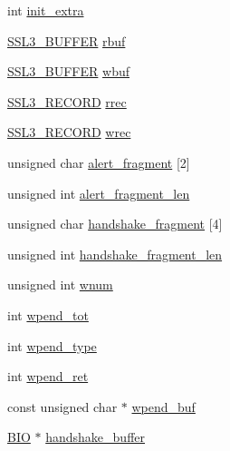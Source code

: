 \begin{DoxyCompactItemize}
\item 
int \hyperlink{structssl3__state__st_a903ef4b0ee733b2cbcbd71680ad12aaa}{init\+\_\+extra}
\item 
\hyperlink{include_2openssl_2ssl3_8h_a83f21b8b26819013daff26a110d590a8}{S\+S\+L3\+\_\+\+B\+U\+F\+F\+ER} \hyperlink{structssl3__state__st_a9a1d2af51256a2a27b1b5b12d3b8e6ee}{rbuf}
\item 
\hyperlink{include_2openssl_2ssl3_8h_a83f21b8b26819013daff26a110d590a8}{S\+S\+L3\+\_\+\+B\+U\+F\+F\+ER} \hyperlink{structssl3__state__st_a4dafcff861c293c4d1c7e89a00918758}{wbuf}
\item 
\hyperlink{include_2openssl_2ssl3_8h_a79995c4da12258c4a4a1c028e319f7ea}{S\+S\+L3\+\_\+\+R\+E\+C\+O\+RD} \hyperlink{structssl3__state__st_a4f4654e61a104fc84503bb658507d673}{rrec}
\item 
\hyperlink{include_2openssl_2ssl3_8h_a79995c4da12258c4a4a1c028e319f7ea}{S\+S\+L3\+\_\+\+R\+E\+C\+O\+RD} \hyperlink{structssl3__state__st_ace5a0cf461da04317868b86d3652e48b}{wrec}
\item 
unsigned char \hyperlink{structssl3__state__st_a64c1fbc616e3f83cb8d283fe6268131c}{alert\+\_\+fragment} \mbox{[}2\mbox{]}
\item 
unsigned int \hyperlink{structssl3__state__st_a549080e51b089972f50c13c3d2c0edf3}{alert\+\_\+fragment\+\_\+len}
\item 
unsigned char \hyperlink{structssl3__state__st_adddf37c3bb729c91cbd4b9e971c1706d}{handshake\+\_\+fragment} \mbox{[}4\mbox{]}
\item 
unsigned int \hyperlink{structssl3__state__st_a810b0f6ab3d1979beb8c3a45cfc21987}{handshake\+\_\+fragment\+\_\+len}
\item 
unsigned int \hyperlink{structssl3__state__st_a2255b8340cdda4fd06078836b88485b8}{wnum}
\item 
int \hyperlink{structssl3__state__st_a11c4b34b49cb1ce9711d3b4f993980fb}{wpend\+\_\+tot}
\item 
int \hyperlink{structssl3__state__st_ae6edd816faa4ac6bed637524020efb7b}{wpend\+\_\+type}
\item 
int \hyperlink{structssl3__state__st_ae2dce92eac9ce1ec1dc53125a72f87b4}{wpend\+\_\+ret}
\item 
const unsigned char $\ast$ \hyperlink{structssl3__state__st_ae1aceb1506bb5d92de935aed9b925959}{wpend\+\_\+buf}
\item 
\hyperlink{crypto_2bio_2bio_8h_af3fabae1c9af50b9312cdff41e11d1dd}{B\+IO} $\ast$ \hyperlink{structssl3__state__st_a2249e642f6921d8cd62d5a7fe3f0f738}{handshake\+\_\+buffer}

\end{DoxyCompactItemize}
